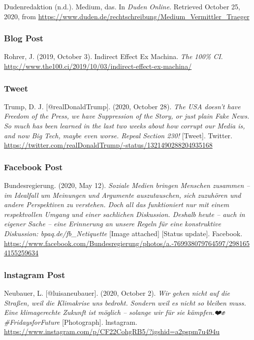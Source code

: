 \documentclass[
  letterpaper,
  DIV=11]{scrreprt}
\begin{document}
Dudenredaktion (n.d.). Medium, das. In \emph{Duden Online}. Retrieved
October 25, 2020, from
\url{https://www.duden.de/rechtschreibung/Medium_Vermittler_Traeger}

\hypertarget{blog-post}{%
\subsubsection{Blog Post}\label{blog-post}}

Rohrer, J. (2019, October 3). Indirect Effect Ex Machina. \emph{The
100\% CI}.
\url{http://www.the100.ci/2019/10/03/indirect-effect-ex-machina/}

\hypertarget{tweet}{%
\subsubsection{Tweet}\label{tweet}}

Trump, D. J. {[}@realDonaldTrump{]}. (2020, October 28). \emph{The USA
doesn't have Freedom of the Press, we have Suppression of the Story, or
just plain Fake News. So much has been learned in the last two weeks
about how corrupt our Media is, and now Big Tech, maybe even worse.
Repeal Section 230!} {[}Tweet{]}. Twitter.
\url{https://twitter.com/realDonaldTrump/-status/1321490288204935168}

\hypertarget{facebook-post}{%
\subsubsection{Facebook Post}\label{facebook-post}}

Bundesregierung. (2020, May 12). \emph{Soziale Medien bringen Menschen
zusammen -- im Idealfall um Meinungen und Argumente auszutauschen, sich
zuzuhören und andere Perspektiven zu verstehen. Doch all das
funktioniert nur mit einem respektvollen Umgang und einer sachlichen
Diskussion. Deshalb heute -- auch in eigener Sache -- eine Erinnerung an
unsere Regeln für eine konstruktive Diskussion: bpaq.de/fb\_Netiquette}
{[}Image attached{]} {[}Status update{]}. Facebook.
\url{https://www.facebook.com/Bundesregierung/photos/a.-769938079764597/2981654155259634}

\hypertarget{lnstagram-post}{%
\subsubsection{lnstagram Post}\label{lnstagram-post}}

Neubauer, L. {[}@luisaneubauer{]}. (2020, October 2). \emph{Wir gehen
nicht auf die Straßen, weil die Klimakrise uns bedroht. Sondern weil es
nicht so bleiben muss. Eine klimagerechte Zukunft ist möglich -- solange
wir für sie kämpfen.❤️✊ \#FridaysforFuture} {[}Photograph{]}.
lnstagram.
\url{https://www.instagram.com/p/CF22CohgRB5/?igshid=a2pspm7u494u}
\end{document}
